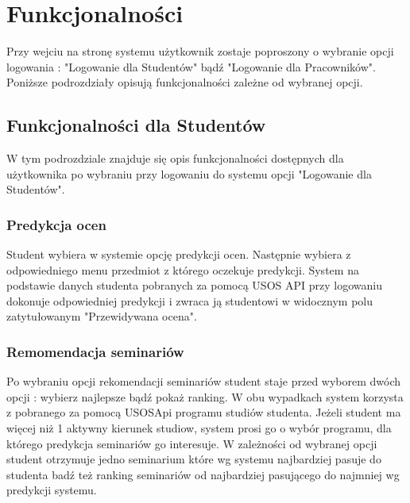 \documentclass[licencjacka]{pracamgr}
\begin{document}
\chapter{Funkcjonalności}

Przy wejciu na stronę systemu użytkownik zostaje poproszony o wybranie opcji logowania : "Logowanie dla Studentów" bądź "Logowanie dla Pracowników". Poniższe podrozdziały opisują funkcjonalności zależne od wybranej opcji.

\section{Funkcjonalności dla Studentów}

W tym podrozdziale znajduje się opis funkcjonalności dostępnych dla użytkownika po wybraniu przy logowaniu do systemu opcji "Logowanie dla Studentów".

\subsection{Predykcja ocen}

Student wybiera w systemie opcję predykcji ocen. Następnie wybiera z odpowiedniego menu przedmiot z którego oczekuje predykcji. System na podstawie danych studenta pobranych za pomocą USOS API przy logowaniu dokonuje odpowiedniej predykcji i zwraca ją studentowi w widocznym polu zatytułowanym "Przewidywana ocena".

\subsection{Remomendacja seminariów}

Po wybraniu opcji rekomendacji seminariów student staje przed wyborem dwóch opcji : wybierz najlepsze bądź pokaż ranking. W obu wypadkach system korzysta z pobranego za pomocą USOSApi programu studiów studenta. Jeżeli student ma więcej niż 1 aktywny kierunek studiow, system prosi go o wybór programu, dla którego predykcja seminariów go interesuje. W zależności od wybranej opcji student otrzymuje jedno seminarium które wg systemu najbardziej pasuje do studenta badź też ranking seminariów od najbardziej pasującego do najmniej wg predykcji systemu.
\end{document}
